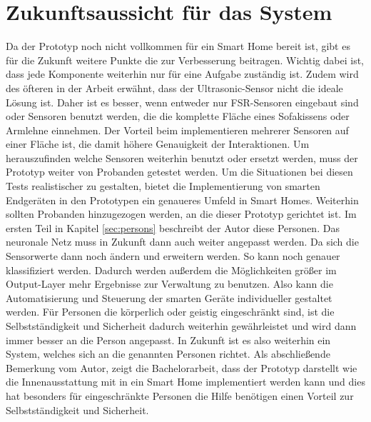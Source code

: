 \section{Zukunftsaussicht für das System}
Da der Prototyp noch nicht vollkommen für ein Smart Home bereit ist, gibt es für die Zukunft weitere Punkte die zur Verbesserung beitragen. Wichtig dabei ist, dass jede Komponente weiterhin nur für eine Aufgabe zuständig ist. Zudem wird des öfteren in der Arbeit erwähnt, dass der Ultrasonic-Sensor nicht die ideale Lösung ist. Daher ist es besser, wenn entweder nur FSR-Sensoren eingebaut sind oder Sensoren benutzt werden, die die komplette Fläche eines Sofakissens oder Armlehne einnehmen. Der Vorteil beim implementieren mehrerer Sensoren auf einer Fläche ist, die damit höhere Genauigkeit der Interaktionen. Um herauszufinden welche Sensoren weiterhin benutzt oder ersetzt werden, muss der Prototyp weiter von Probanden getestet werden. Um die Situationen bei diesen Tests realistischer zu gestalten, bietet die Implementierung von smarten Endgeräten in den Prototypen ein genaueres Umfeld in Smart Homes. Weiterhin sollten Probanden hinzugezogen werden, an die dieser Prototyp gerichtet ist. Im ersten Teil in Kapitel \ref{sec:persons} beschreibt der Autor diese Personen.
\newpage
Das neuronale Netz muss in Zukunft dann auch weiter angepasst werden. Da sich die Sensorwerte dann noch ändern und erweitern werden. So kann noch genauer klassifiziert werden. Dadurch werden außerdem die Möglichkeiten größer im Output-Layer mehr Ergebnisse zur Verwaltung zu benutzen. Also kann die Automatisierung und Steuerung der smarten Geräte individueller gestaltet werden. Für Personen die körperlich oder geistig eingeschränkt sind, ist die Selbstständigkeit und Sicherheit dadurch weiterhin gewährleistet und wird dann immer besser an die Person angepasst. In Zukunft ist es also weiterhin ein System, welches sich an die genannten Personen richtet.
\newline
\newline
Als abschließende Bemerkung vom Autor, zeigt die Bachelorarbeit, dass der Prototyp darstellt wie die Innenausstattung mit in ein Smart Home implementiert werden kann und dies hat besonders für eingeschränkte Personen die Hilfe benötigen einen Vorteil zur Selbstständigkeit und Sicherheit.